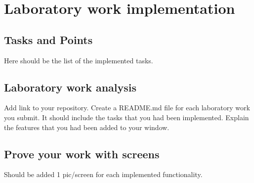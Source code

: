 \section{Laboratory work implementation}

\subsection{Tasks and Points}

Here should be the list of the implemented tasks.

\subsection{Laboratory work analysis}

Add link to your repository.
Create a README.md file for each laboratory work you submit. It should include the tasks that you had been implemented.
Explain the features that you had been added to your window.

\subsection{Prove your work with screens}

Should be added 1 pic/screen for each implemented functionality.

\clearpage
